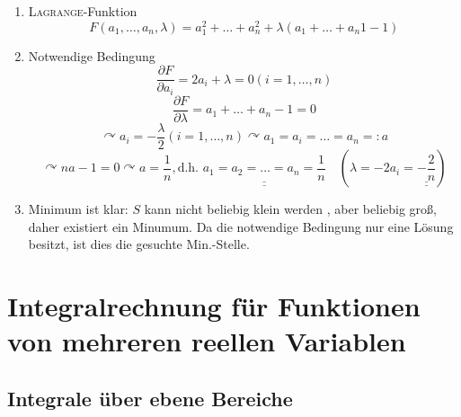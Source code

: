 \documentclass[a4paper]{scrartcl}
\begin{document}
\begin{enumerate}
\item \textsc{Lagrange}-Funktion \[ F(a_1, \dots,a_n,\lambda ) = a_1^2 + \dots + a_n^2 + \lambda (a_1 + \dots + a_n1-1)\]
\item Notwendige Bedingung
\[ \frac{\partial F}{\partial a_i} = 2 a_i + \lambda  = 0 (i=1, \dots, n) \] %
\[ \frac{\partial F}{\partial \lambda} = a_1 + \dots + a_n -1 = 0 \] %
\[ \curvearrowright a_i = - \frac{\lambda}{2} (i=1,\dots,n) \curvearrowright a_1= a_i = \dots = a_n =: a \]
\[ \curvearrowright n a -1 = 0 \curvearrowright a = \frac{1}{n}, \text{d.h. } \underline{\underline{a_1=a_2 = \dots = a_n = \frac{1}{n} }} \quad (\lambda = -2a_i = \underline{\underline{-\frac{2}{n}}}) \]
\item Minimum ist klar: $S$ kann nicht beliebig  klein werden , aber beliebig groß, daher existiert ein Minumum. Da die notwendige Bedingung nur eine Lösung besitzt, ist dies die gesuchte Min.-Stelle.
\end{enumerate}

\section{Integralrechnung  für Funktionen von mehreren reellen Variablen}
\subsection{Integrale über ebene Bereiche}
\end{document}
